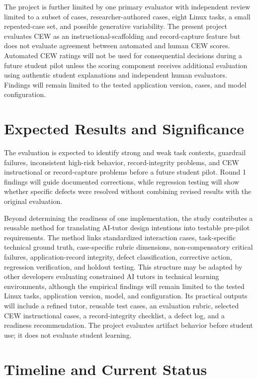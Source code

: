 \documentclass[conference]{IEEEtran}
\begin{document}
The project is further limited by one primary evaluator with independent review limited to a subset of cases,
researcher-authored cases, eight Linux tasks, a small repeated-case set,
and possible generative variability. The present project evaluates CEW
as an instructional-scaffolding and record-capture feature but does not
evaluate agreement between automated and human CEW scores. Automated CEW
ratings will not be used for consequential decisions during a future
student pilot unless the scoring component receives additional
evaluation using authentic student explanations and independent human
evaluators. Findings will remain limited to the tested application
version, cases, and model configuration.

\section{Expected Results and Significance}

The evaluation is expected to identify strong and weak task contexts,
guardrail failures, inconsistent high-risk behavior, record-integrity
problems, and CEW instructional or record-capture problems before a
future student pilot. Round 1 findings will guide documented
corrections, while regression testing will show whether specific defects
were resolved without combining revised results with the original
evaluation.

Beyond determining the readiness of one implementation, the study contributes a reusable method for translating AI-tutor design intentions into testable pre-pilot requirements. The method links standardized interaction cases, task-specific technical ground truth, case-specific rubric dimensions, non-compensatory critical failures, application-record integrity, defect classification, corrective action, regression verification, and holdout testing. This structure may be adapted by other developers evaluating constrained AI tutors in technical learning environments, although the empirical findings will remain limited to the tested Linux tasks, application version, model, and configuration. Its practical outputs will
include a refined tutor, reusable test cases, an evaluation rubric,
selected CEW instructional cases, a record-integrity checklist, a defect
log, and a readiness recommendation. The project evaluates artifact
behavior before student use; it does not evaluate student learning.

\section{Timeline and Current Status}
\end{document}
